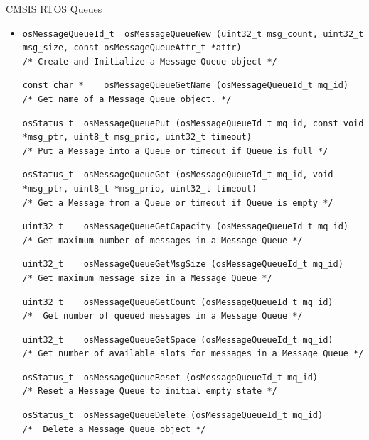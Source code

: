 \begin{frame}[fragile]{CMSIS RTOS Queues}
    \begin{itemize}
        \item []
         \begin{verbatim}
osMessageQueueId_t 	osMessageQueueNew (uint32_t msg_count, uint32_t msg_size, const osMessageQueueAttr_t *attr)
/* Create and Initialize a Message Queue object */
         \end{verbatim}
         \begin{verbatim}
const char * 	osMessageQueueGetName (osMessageQueueId_t mq_id)
/* Get name of a Message Queue object. */
         \end{verbatim}
         \begin{verbatim}
osStatus_t 	osMessageQueuePut (osMessageQueueId_t mq_id, const void *msg_ptr, uint8_t msg_prio, uint32_t timeout)
/* Put a Message into a Queue or timeout if Queue is full */
         \end{verbatim}
         \begin{verbatim}
osStatus_t 	osMessageQueueGet (osMessageQueueId_t mq_id, void *msg_ptr, uint8_t *msg_prio, uint32_t timeout)
/* Get a Message from a Queue or timeout if Queue is empty */
         \end{verbatim}
         \begin{verbatim}
uint32_t 	osMessageQueueGetCapacity (osMessageQueueId_t mq_id)
/* Get maximum number of messages in a Message Queue */
         \end{verbatim}
         \begin{verbatim}
uint32_t 	osMessageQueueGetMsgSize (osMessageQueueId_t mq_id)
/* Get maximum message size in a Message Queue */
         \end{verbatim}
         \begin{verbatim}
uint32_t 	osMessageQueueGetCount (osMessageQueueId_t mq_id)
/* 	Get number of queued messages in a Message Queue */
         \end{verbatim}
         \begin{verbatim}
uint32_t 	osMessageQueueGetSpace (osMessageQueueId_t mq_id)
/* Get number of available slots for messages in a Message Queue */
         \end{verbatim}
         \begin{verbatim}
osStatus_t 	osMessageQueueReset (osMessageQueueId_t mq_id)
/* Reset a Message Queue to initial empty state */
         \end{verbatim}
         \begin{verbatim}
osStatus_t 	osMessageQueueDelete (osMessageQueueId_t mq_id)
/* 	Delete a Message Queue object */
         \end{verbatim}


\end{itemize}
\end{frame}
